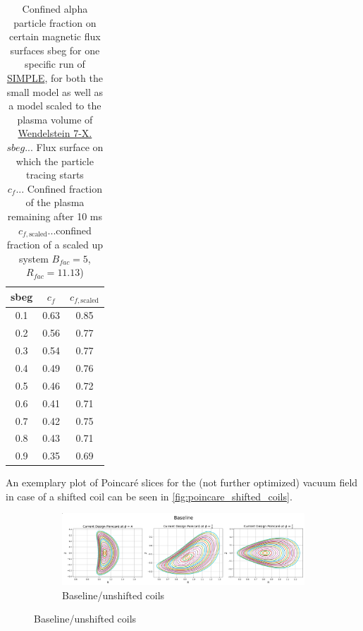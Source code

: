 \begin{table}[H]
    \caption{Confined alpha particle fraction on certain magnetic flux surfaces sbeg for one specific run of \href{https://github.com/itpplasma/SIMPLE}{SIMPLE}, for both the small model as well as a model scaled to the plasma volume of \href{https://www.ipp.mpg.de/wendelstein7x}{Wendelstein 7-X.}\\
    $sbeg$... Flux surface on which the particle tracing starts\\  
    $c_f$... Confined fraction of the plasma remaining after 10 ms\\
    $c_{f,\text{scaled}}$...confined fraction of a scaled up system $B_{fac}=5$, $R_{fac}=11.13$)}
    \centering
    \begin{tabular}{c c c}
        sbeg & $c_f$ & $c_{f,\text{scaled}}$ \\
        \hline
        0.1 & 0.63 & 0.85 \\
        0.2 & 0.56 & 0.77 \\
        0.3 & 0.54 & 0.77 \\
        0.4 & 0.49 & 0.76 \\
        0.5 & 0.46 & 0.72 \\
        0.6 & 0.41 & 0.71 \\
        0.7 & 0.42 & 0.75 \\
        0.8 & 0.43 & 0.71 \\
        0.9 & 0.35 & 0.69 \\
    \end{tabular}
    \label{tab:conffrac}
\end{table}
An exemplary plot of Poincaré slices for the (not further optimized) vacuum field in case of a shifted coil can be seen in \autoref{fig:poincare_shifted_coils}.

\begin{figure}[H]
\centering
\captionsetup[subfigure]{justification=centering}
\begin{subfigure}{1.0\textwidth}
\centering
\includegraphics[width=1.0\linewidth]{Images/03_Design/good.png}
\caption{Baseline/unshifted coils}
\label{fig:unshifted}
\end{subfigure}
\end{figure}

